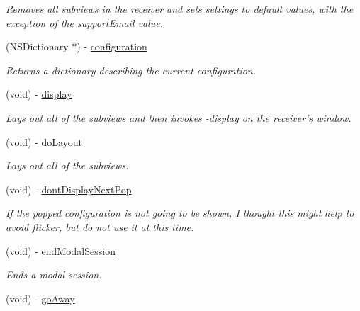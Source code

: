 \begin{CompactItemize}
\begin{CompactList}\small\item\em Removes all subviews in the receiver and sets settings to default values, with the exception of the supportEmail value. \item\end{CompactList}\item 
(NSDictionary $\ast$) - \hyperlink{interface_s_s_y_alert_0be2eb58a0463feca0bf58361ffd3a13}{configuration}
\begin{CompactList}\small\item\em Returns a dictionary describing the current configuration. \item\end{CompactList}\item 
(void) - \hyperlink{interface_s_s_y_alert_d100de29cd1cd7f30f23bd0cf7f323e1}{display}
\begin{CompactList}\small\item\em Lays out all of the subviews and then invokes -display on the receiver's window. \item\end{CompactList}\item 
(void) - \hyperlink{interface_s_s_y_alert_56274921e6a14427b3fded4caa007d2a}{doLayout}
\begin{CompactList}\small\item\em Lays out all of the subviews. \item\end{CompactList}\item 
\hypertarget{interface_s_s_y_alert_3bf3d563a78f82e8b667d6a4f7d188c9}{
(void) - \hyperlink{interface_s_s_y_alert_3bf3d563a78f82e8b667d6a4f7d188c9}{dontDisplayNextPop}}
\label{interface_s_s_y_alert_3bf3d563a78f82e8b667d6a4f7d188c9}

\begin{CompactList}\small\item\em If the popped configuration is not going to be shown, I thought this might help to avoid flicker, but do not use it at this time. \item\end{CompactList}\item 
(void) - \hyperlink{interface_s_s_y_alert_eddadc2439805c46157f26b80fc92750}{endModalSession}
\begin{CompactList}\small\item\em Ends a modal session. \item\end{CompactList}\item 
\hypertarget{interface_s_s_y_alert_f3de0f8c58978b6ad9963703a95b0052}{
(void) - \hyperlink{interface_s_s_y_alert_f3de0f8c58978b6ad9963703a95b0052}{goAway}}
\label{interface_s_s_y_alert_f3de0f8c58978b6ad9963703a95b0052}


\end{CompactItemize}
